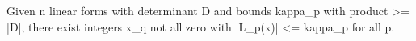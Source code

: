 Given n linear forms with determinant D and bounds kappa_p with product >= |D|, there exist integers x_q not all zero with |L_p(x)| <= kappa_p for all p.

